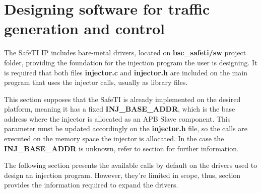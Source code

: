 \newpage
\section{Designing software for traffic generation and control}
\label{software}

The SafeTI IP includes bare-metal drivers, located on \textbf{bsc\_safeti/sw} project folder, providing the foundation for the injection program the user is designing. 
It is required that both files \textbf{injector.c} and \textbf{injector.h} are included on the main program that uses the injector calls, usually as library files.

This section supposes that the SafeTI is already implemented on the desired platform, meaning it has a fixed \textbf{INJ\_BASE\_ADDR}, which is the base address 
where the injector is allocated as an APB Slave component. This parameter must be updated accordingly on the \textbf{injector.h} file, so the calls are executed 
on the memory space the injector is allocated. In the case the \textbf{INJ\_BASE\_ADDR} is unknown, refer to section \fullref{} for further information.

The following section  presents the available calls by default on the drivers used to design an injection program.
However, they're limited in scope, thus, section  provides the information required to expand the drivers.





